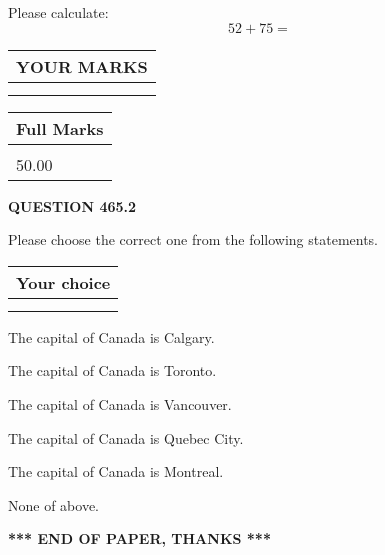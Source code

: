 \documentclass[12pt]{article}
\begin{document}
  
 
Please calculate:
\begin{equation}
52 +  %
75 = \nonumber
\end{equation}
 

 

 
  
\vspace{0.2in}
  
\noindent\begin{tabular}{|l|}
\hline
 YOUR MARKS  \\
\hline
 \\ 
 \\ 
\hline
\end{tabular}
\hspace{0.05in} \begin{tabular}{|l|}
\hline
 Full Marks  \\
\hline
 \\ 
50.00 \\
\hline
\end{tabular}
{\textbf{\Large{QUESTION
465.2 
}}}
  
  
Please choose the correct one from the following statements.
  
  
\noindent\hspace{3.0in} \begin{tabular}{|l|}
\hline
Your choice \\
\hline
 \\ 
 \\ 
\hline
\end{tabular}
  
  
 
 
The capital of Canada is Calgary.
 
 
The capital of Canada is Toronto.
 
 
The capital of Canada is Vancouver.
 
 
The capital of Canada is Quebec City.
 
 
The capital of Canada is Montreal.
 
 
 None of above.
 
 
   
   
 \vspace{0.2in}
 
   
   
   
   
\vspace{1.0in} 
{\textbf{\large{ *** END OF PAPER, THANKS *** }}} 
   
\end{document}
